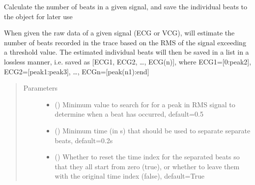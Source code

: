 \documentclass[letterpaper,10pt,english]{sphinxmanual}
\begin{document}
\begin{fulllineitems}
\begin{fulllineitems}
\begin{description}
\end{description}



\end{fulllineitems}


\begin{fulllineitems}
\label{\detokenize{_autosummary/signalanalysis.general.Signal:id0}}
\sphinxAtStartPar
Calculate the number of beats in a given signal, and save the individual beats to the object for later use

\sphinxAtStartPar
When given the raw data of a given signal (ECG or VCG), will estimate the number of beats recorded in the trace
based on the RMS of the signal exceeding a threshold value. The estimated individual beats will then be saved in
a list in a lossless manner, i.e. saved as {[}ECG1, ECG2, …, ECG(n){]}, where ECG1={[}0:peak2{]}, ECG2={[}peak1:peak3{]},
…, ECGn={[}peak(n\sphinxhyphen{}1):end{]}
\begin{quote}\begin{description}
\item[{Parameters}] \leavevmode\begin{itemize}
\item {} 
\sphinxAtStartPar
{} () \textendash{} Minimum value to search for for a peak in RMS signal to determine when a beat has occurred, default=0.5

\item {} 
\sphinxAtStartPar
{} () \textendash{} Minimum time (in s) that should be used to separate separate beats, default=0.2s

\item {} 
\sphinxAtStartPar
{} () \textendash{} Whether to reset the time index for the separated beats so that they all start from zero (true),
or whether to leave them with the original time index (false), default=True


\end{itemize}
\end{description}
\end{quote}
\end{fulllineitems}
\end{fulllineitems}
\end{document}
